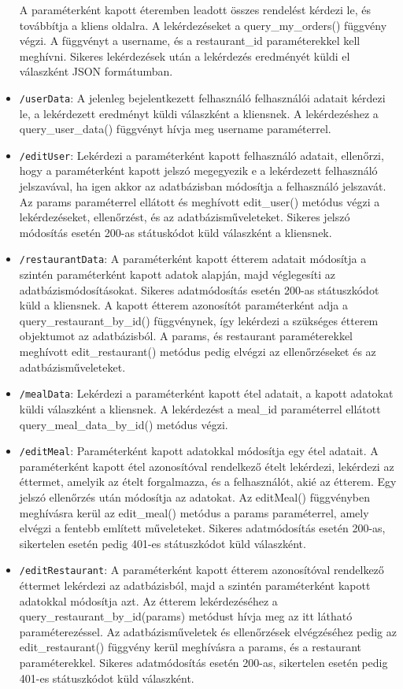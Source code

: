 \begin{itemize}
A paraméterként kapott éteremben leadott összes rendelést kérdezi le, és továbbítja a kliens oldalra. A lekérdezéseket a query\_my\_orders() függvény végzi. A függvényt a username, és a restaurant\_id paraméterekkel kell meghívni. Sikeres lekérdezések után a lekérdezés eredményét küldi el válaszként JSON formátumban.
\item \texttt{/userData}:
A jelenleg bejelentkezett felhasználó felhasználói adatait kérdezi le, a lekérdezett eredményt küldi válaszként a kliensnek. A lekérdezéshez a query\_user\_data() függvényt hívja meg username paraméterrel.
\item \texttt{/editUser}:
Lekérdezi a paraméterként kapott felhasználó adatait, ellenőrzi, hogy a paraméterként kapott jelszó megegyezik e a lekérdezett felhasználó jelszavával, ha igen akkor az adatbázisban módosítja a felhasználó jelszavát. Az params paraméterrel ellátott és meghívott edit\_user() metódus végzi a lekérdezéseket, ellenőrzést, és az adatbázisműveleteket. Sikeres jelszó módosítás esetén 200-as státuskódot küld válaszként a kliensnek.
\item \texttt{/restaurantData}:
A paraméterként kapott étterem adatait módosítja a szintén paraméterként kapott adatok alapján, majd véglegesíti az adatbázismódosításokat. Sikeres adatmódosítás esetén 200-as státuszkódot küld a kliensnek. A kapott étterem azonosítót paraméterként adja a query\_restaurant\_by\_id() függvénynek, így lekérdezi a szükséges étterem objektumot az adatbázisból. A params, és restaurant paraméterekkel meghívott edit\_restaurant() metódus pedig elvégzi az ellenőrzéseket és az adatbázisműveleteket.
\item \texttt{/mealData}:
Lekérdezi a paraméterként kapott étel adatait, a kapott adatokat küldi válaszként a kliensnek. A lekérdezést a meal\_id paraméterrel ellátott query\_meal\_data\_by\_id() metódus végzi.
\item \texttt{/editMeal}:
Paraméterként kapott adatokkal módosítja egy étel adatait. A paraméterként kapott étel azonosítóval rendelkező ételt lekérdezi, lekérdezi az éttermet, amelyik az ételt forgalmazza, és a felhasználót, akié az étterem. Egy jelszó ellenőrzés után módosítja az adatokat. Az editMeal() függvényben meghívásra kerül az edit\_meal() metódus a params paraméterrel, amely elvégzi a fentebb említett műveleteket. Sikeres adatmódosítás esetén 200-as, sikertelen esetén pedig 401-es státuszkódot küld válaszként.
\item \texttt{/editRestaurant}:
A paraméterként kapott étterem azonosítóval rendelkező éttermet lekérdezi az adatbázisból, majd a szintén paraméterként kapott adatokkal módosítja azt. Az étterem lekérdezéséhez a query\_restaurant\_by\_id(params) metódust hívja meg az itt látható paraméterezéssel. Az adatbázisműveletek és ellenőrzések elvégzéséhez pedig az edit\_restaurant() függvény kerül meghívásra a params, és a restaurant paraméterekkel. Sikeres adatmódosítás esetén 200-as, sikertelen esetén pedig 401-es státuszkódot küld válaszként.

\end{itemize}
